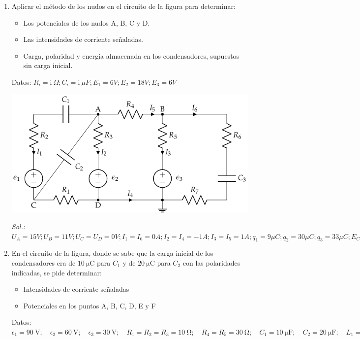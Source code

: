 \begin{enumerate}
\item Aplicar el método de los nudos en el circuito de la figura para
  determinar:
  \begin{itemize}
  \item Los potenciales de los nudos A, B, C y D.
  \item Las intensidades de corriente señaladas.
  \item Carga, polaridad y energía almacenada en los condensadores,
    supuestos sin carga inicial.
  \end{itemize}
  Datos:
  $R_i = \mathrm{i\ } \Omega; C_i = \mathrm{i\ } \mu F; E_1 = 6V; E_2
  = 18 V; E_3 = {6} V$
  \begin{center}
    \includegraphics[]{../figs/nudos_condensadores.pdf}
  \end{center}

  \emph{Sol.:
    $U_A=15V; U_B=11V; U_C=U_D=0V; I_1=I_6=0A;I_2=I_4=-1A; I_3=I_5=1A;
    q_1=9\mu C; q_2=30\mu C; q_3=33\mu C; E_{C1}=40.5\mu J;
    E_{C2}=225\mu J;E_{C2}=181.5\mu J$}

\item En el circuito de la figura, donde se sabe
  que la carga inicial de los condensadores era de
  $\qty{10}{\micro\coulomb}$ para $C_1$ y de
  $\qty{20}{\micro\coulomb}$ para $C_2$ con las polaridades indicadas,
  se pide determinar:
  \begin{itemize}
  \item Intensidades de corriente señaladas
  \item Potenciales en los puntos A, B, C, D, E y F
  \end{itemize}

  Datos:
  $\epsilon_1=\SI{90}{\volt};\quad \epsilon_2=\SI{60}{\volt};\quad
  \epsilon_3=\SI{30}{\volt};\quad R_{1}= R_2 = R_3 =
  \SI{10}{\ohm};\quad R_{4}= R_5 = \SI{30}{\ohm};\quad C_{1}=
  \SI{10}{\micro\farad};\quad C_{2}= \SI{20}{\micro\farad};\quad L_1 =
  \SI{1}{\micro\henry}$


\end{enumerate}
